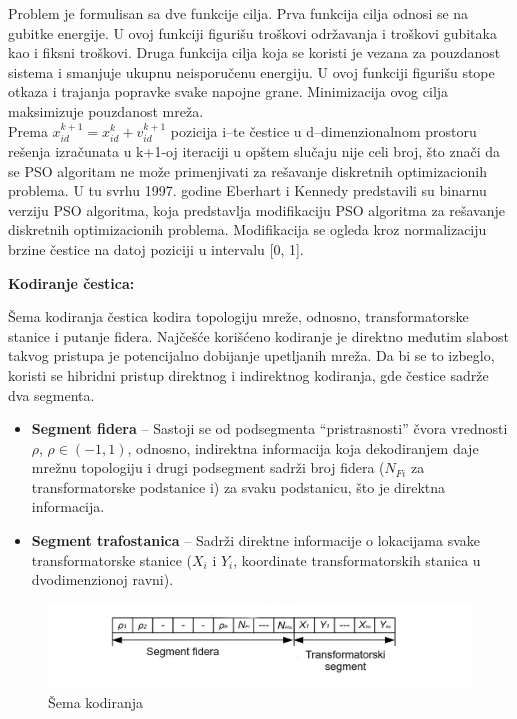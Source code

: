 \documentclass[a4paper]{article}
\begin{document}
Problem je formulisan sa dve funkcije cilja. Prva funkcija cilja odnosi se na gubitke energije. U ovoj funkciji figurišu troškovi održavanja i troškovi gubitaka kao i fiksni troškovi. Druga funkcija cilja koja se koristi je vezana za pouzdanost sistema i smanjuje ukupnu neisporučenu energiju. U ovoj funkciji figurišu stope otkaza i trajanja popravke svake napojne grane. Minimizacija ovog cilja maksimizuje pouzdanost mreža.\\


Prema \(x_{i d}^{k+1} = x_{i d}^{k} + v_{i d}^{k+1}  \) pozicija i–te čestice u d–dimenzionalnom prostoru rešenja izračunata u k+1-oj iteraciji u opštem slučaju nije celi broj, što znači da se PSO algoritam ne može primenjivati za rešavanje diskretnih optimizacionih problema. U tu svrhu 1997. godine Eberhart i Kennedy predstavili su binarnu verziju PSO algoritma, koja predstavlja modifikaciju PSO algoritma za rešavanje diskretnih optimizacionih problema. Modifikacija se ogleda kroz normalizaciju brzine čestice na datoj poziciji u intervalu [0, 1].


\begin{flushleft}
\textbf{Kodiranje čestica:} 
\end{flushleft}

Šema kodiranja čestica kodira topologiju mreže, odnosno, transformatorske stanice i putanje fidera. Najčešće korišćeno kodiranje je direktno međutim slabost takvog pristupa je potencijalno dobijanje upetljanih mreža. Da bi se to izbeglo, koristi se hibridni pristup direktnog i indirektnog kodiranja, gde čestice sadrže dva segmenta.

\vspace{2mm} 

\begin{itemize}
\item \textbf{Segment fidera} – Sastoji se od podsegmenta “pristrasnosti” čvora vrednosti $\rho$,  $\rho \in (-1,1)$, odnosno, indirektna informacija koja dekodiranjem daje mrežnu topologiju i drugi podsegment sadrži broj fidera (\(N_{Fi}\) za transformatorske podstanice i) za svaku podstanicu, što je direktna informacija.

\item \textbf{Segment trafostanica} – Sadrži direktne informacije o lokacijama svake transformatorske stanice  (\(X_{i}\) i \(Y_{i}\), koordinate transformatorskih stanica u dvodimenzionoj ravni).
\end{itemize}

\begin{figure}[htp]
    \centering
    \includegraphics[scale=0.3]{foto4.jpg}
    \caption{Šema kodiranja}
    \label{fig:sema_kodiranja}
\end{figure}
\end{document}
